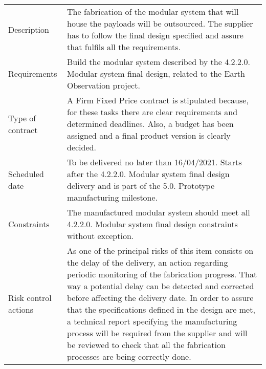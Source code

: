 \begin{table}[H]
	\centering
	\begin{tabular}{>{\raggedright\arraybackslash}p{3cm} >{\arraybackslash}p{11cm}}
		
		\toprule[2pt]
		
		\multicolumn{2}{c}{\textbf{SOW - 5.1.2. Manufacturing of modular system}}\\
		
		\midrule[1.5pt]
		
		Description & The fabrication of the modular system that will house the payloads will be outsourced. The supplier has to follow the final design specified and assure that fulfils all the requirements.\vspace{0.2cm} \\
		
		\midrule
		
		Requirements & Build the modular system described by the 4.2.2.0. Modular system final design, related to the Earth Observation project.\vspace{0.2cm} \\
		
		\midrule
		
		Type of contract & A Firm Fixed Price contract is stipulated because, for these tasks there are clear requirements and determined deadlines. Also, a budget has been assigned and a final product version is clearly decided.\vspace{0.2cm} \\
		
		\midrule
		
		Scheduled date & To be delivered no later than 16/04/2021. Starts after the 4.2.2.0. Modular system final design delivery and is part of the 5.0. Prototype manufacturing milestone.\vspace{0.2cm} \\
		
		\midrule
		
		Constraints & The manufactured modular system should meet all 4.2.2.0. Modular system final design constraints without exception.\vspace{0.2cm} \\
		
		\midrule
		
		Risk control actions & As one of the principal risks of this item consists on the delay of the delivery, an action regarding periodic monitoring of the fabrication progress. That way a potential delay can be detected and corrected before affecting the delivery date.
		In order to assure that the specifications defined in the design are met, a technical report specifying the manufacturing process will be required from the supplier and will be reviewed to check that all the fabrication processes are being correctly done.\vspace{0.2cm} \\
		

\end{tabular}
\end{table}
